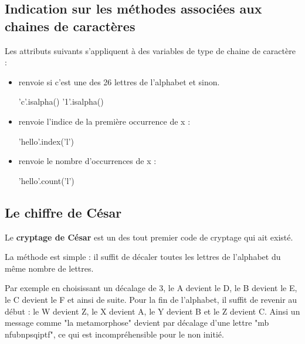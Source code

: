 
\setcounter{section}{1}

\subsection{Indication sur les méthodes associées aux chaines de caractères}

Les attributs suivants s'appliquent à des variables de type de chaine de caractère :
\begin{itemize}
\item {} renvoie  si c'est une des 26 lettres de l'alphabet et  sinon.
\begin{pyconsole}
'c'.isalpha()
'1'.isalpha()
\end{pyconsole}
\item {} renvoie l'indice de la première occurrence de x :
\begin{pyconsole}
'hello'.index('l')
\end{pyconsole}
\item {} renvoie le nombre d'occurrences de x :
\begin{pyconsole}
'hello'.count('l')
\end{pyconsole}
\end{itemize}

\subsection{Le chiffre de César}



Le \textbf{cryptage de César} est un des tout premier code de cryptage qui ait existé. 

La méthode est simple : il suffit de décaler toutes les lettres de l'alphabet du même nombre de lettres. 



Par exemple en choisissant un décalage de 3, le A devient le D, le B devient le E, le C devient le F et ainsi de suite. Pour la fin de l'alphabet, il suffit de revenir au début : le W devient Z, le X devient A, le Y devient B et le Z devient C. Ainsi un message comme "la metamorphose" devient par décalage d'une lettre "mb nfubnpsqiptf", ce qui est incompréhensible pour le non initié.







